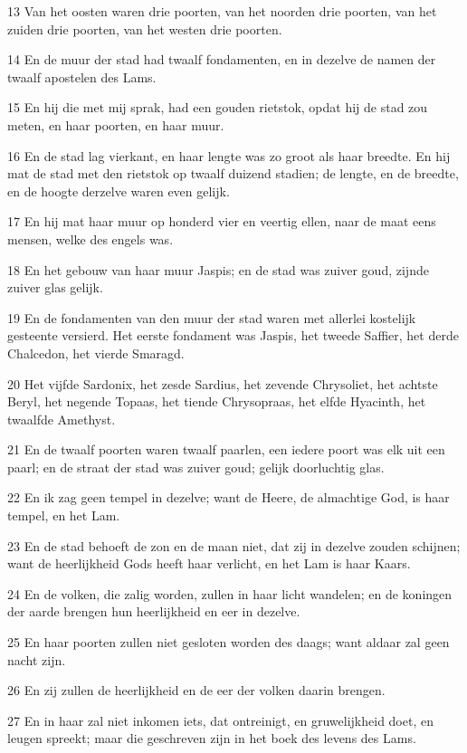 \par 13 Van het oosten waren drie poorten, van het noorden drie poorten, van het zuiden drie poorten, van het westen drie poorten.
\par 14 En de muur der stad had twaalf fondamenten, en in dezelve de namen der twaalf apostelen des Lams.
\par 15 En hij die met mij sprak, had een gouden rietstok, opdat hij de stad zou meten, en haar poorten, en haar muur.
\par 16 En de stad lag vierkant, en haar lengte was zo groot als haar breedte. En hij mat de stad met den rietstok op twaalf duizend stadien; de lengte, en de breedte, en de hoogte derzelve waren even gelijk.
\par 17 En hij mat haar muur op honderd vier en veertig ellen, naar de maat eens mensen, welke des engels was.
\par 18 En het gebouw van haar muur Jaspis; en de stad was zuiver goud, zijnde zuiver glas gelijk.
\par 19 En de fondamenten van den muur der stad waren met allerlei kostelijk gesteente versierd. Het eerste fondament was Jaspis, het tweede Saffier, het derde Chalcedon, het vierde Smaragd.
\par 20 Het vijfde Sardonix, het zesde Sardius, het zevende Chrysoliet, het achtste Beryl, het negende Topaas, het tiende Chrysopraas, het elfde Hyacinth, het twaalfde Amethyst.
\par 21 En de twaalf poorten waren twaalf paarlen, een iedere poort was elk uit een paarl; en de straat der stad was zuiver goud; gelijk doorluchtig glas.
\par 22 En ik zag geen tempel in dezelve; want de Heere, de almachtige God, is haar tempel, en het Lam.
\par 23 En de stad behoeft de zon en de maan niet, dat zij in dezelve zouden schijnen; want de heerlijkheid Gods heeft haar verlicht, en het Lam is haar Kaars.
\par 24 En de volken, die zalig worden, zullen in haar licht wandelen; en de koningen der aarde brengen hun heerlijkheid en eer in dezelve.
\par 25 En haar poorten zullen niet gesloten worden des daags; want aldaar zal geen nacht zijn.
\par 26 En zij zullen de heerlijkheid en de eer der volken daarin brengen.
\par 27 En in haar zal niet inkomen iets, dat ontreinigt, en gruwelijkheid doet, en leugen spreekt; maar die geschreven zijn in het boek des levens des Lams.

